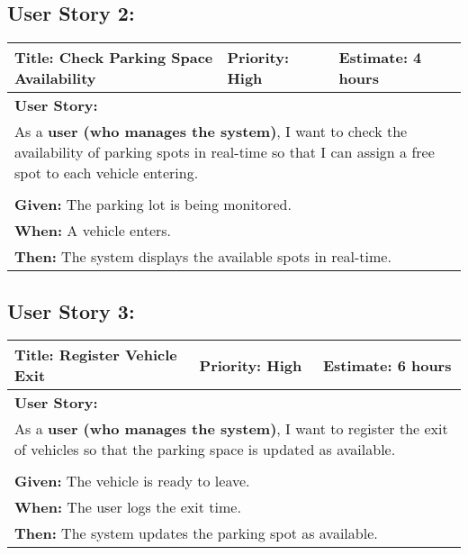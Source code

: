 \subsection{User Story 2:}
\begin{table}[H]
    \centering
    \begin{tabular}{|p{}|p{}|p{}|}
        \hline
        \rowcolor{lightblue}
        \textbf{Title: Check Parking Space Availability} & \textbf{Priority: High} & \textbf{Estimate: 4 hours} \\
        \hline
        \multicolumn{3}{|l|}{\textbf{User Story:}} \\
        \multicolumn{3}{|p{15cm}|}{As a \textbf{user (who manages the system)}, I want to check the availability of parking spots in real-time so that I can assign a free spot to each vehicle entering.} \\
        \hline
        \rowcolor{lightblue}
        \multicolumn{3}{|c|}{\textbf{Acceptance Criteria:}} \\
        \hline
        \multicolumn{3}{|l|}{\textbf{Given:} The parking lot is being monitored.} \\
        \multicolumn{3}{|l|}{\textbf{When:} A vehicle enters.} \\
        \multicolumn{3}{|l|}{\textbf{Then:} The system displays the available spots in real-time.} \\
        \hline
    \end{tabular}
\end{table}

\subsection{User Story 3:}
\begin{table}[H]
    \centering
    \begin{tabular}{|p{}|p{}|p{}|}
        \hline
        \rowcolor{lightblue}
        \textbf{Title: Register Vehicle Exit} & \textbf{Priority: High} & \textbf{Estimate: 6 hours} \\
        \hline
        \multicolumn{3}{|l|}{\textbf{User Story:}} \\
        \multicolumn{3}{|p{15cm}|}{As a \textbf{user (who manages the system)}, I want to register the exit of vehicles so that the parking space is updated as available.} \\
        \hline
        \rowcolor{lightblue}
        \multicolumn{3}{|c|}{\textbf{Acceptance Criteria:}} \\
        \hline
        \multicolumn{3}{|l|}{\textbf{Given:} The vehicle is ready to leave.} \\
        \multicolumn{3}{|l|}{\textbf{When:} The user logs the exit time.} \\
        \multicolumn{3}{|l|}{\textbf{Then:} The system updates the parking spot as available.} \\
        \hline
    \end{tabular}
\end{table}

